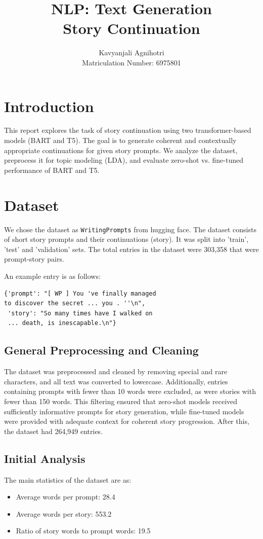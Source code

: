 \documentclass[11pt]{article}
\title{NLP: Text Generation \\
Story Continuation}
\author{Kavyanjali Agnihotri \\ Matriculation Number: 6975801}
\begin{document}
\maketitle

\section{Introduction}
This report explores the task of story continuation using two transformer-based models (BART and T5). The goal is to generate coherent and contextually appropriate continuations for given story prompts. We analyze the dataset, preprocess it for topic modeling (LDA), and evaluate zero-shot vs. fine-tuned performance of BART and T5.

\section{Dataset}
We chose the dataset as \texttt{WritingPrompts} from hugging face. The dataset consists of short story prompts and their continuations (story). It was split into 'train', 'test' and 'validation' sets. The total entries in the dataset were 303,358 that were prompt-story pairs. 

An example entry is as follows: 
\begin{verbatim}
{'prompt': "[ WP ] You 've finally managed 
to discover the secret ... you . ''\n",
 'story': "So many times have I walked on 
 ... death, is inescapable.\n"}
\end{verbatim}

\subsection{General Preprocessing and Cleaning}
The dataset was preprocessed and cleaned by removing special and rare characters, and all text was converted to lowercase. Additionally, entries containing prompts with fewer than 10 words were excluded, as were stories with fewer than 150 words. This filtering ensured that zero-shot models received sufficiently informative prompts for story generation, while fine-tuned models were provided with adequate context for coherent story progression. After this, the dataset had 264,949 entries. 

\subsection{Initial Analysis}
The main statistics of the dataset are as:
\begin{itemize}
    \item Average words per prompt: 28.4
    \item Average words per story: 553.2
    \item Ratio of story words to prompt words: 19.5
\end{itemize}
\end{document}
